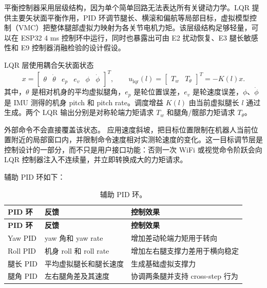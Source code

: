\documentclass[12pt, a4paper]{article}
\begin{document}
平衡控制器采用层级结构，因为单个简单回路无法表达所有关键动力学。LQR 提供主要矢状面平衡作用，PID 环调节腿长、横滚和偏航等局部目标，虚拟模型控制（VMC）把整体腿部虚拟力映射为各关节电机力矩。该层级结构足够轻量，可以在 ESP32 4 ms 控制环中运行，同时也暴露出可由 E2 扰动恢复、E3 腿长敏感性和 E9 控制器消融检验的设计假设。

LQR 层使用耦合矢状面状态
\[
x =
\begin{bmatrix}
\theta & \dot{\theta} & e_p & e_v & \phi & \dot{\phi}
\end{bmatrix}^{T},
\qquad
u_{\mathrm{lqr}}(l) =
\begin{bmatrix}
T_w & T_\theta
\end{bmatrix}^{T}
= -K(l)x .
\]
其中，\(\theta\) 是相对机身的平均虚拟腿角，\(e_p\) 是轮位置误差，\(e_v\) 是轮速度误差，\(\phi\)、\(\dot{\phi}\) 是 IMU 测得的机身 pitch 和 pitch rate。调度增益 \(K(l)\) 由当前虚拟腿长 \(l\) 通过 \texttt{} 生成。两个 LQR 输出分别是对称轮端力矩请求 \(T_w\) 和腿角/髋部力矩请求 \(T_\theta\)。

外部命令不会直接覆盖该状态。\texttt{} 应用速度斜坡，把目标位置限制在机器人当前位置附近的局部窗口内，并限制命令速度相对实测轮速度的变化。这一目标调节层是控制设计的一部分，而不只是用户接口功能：否则一次 WiFi 或视觉命令阶跃会向 LQR 控制器注入不连续量，并立即转换成大的力矩请求。

辅助 PID 环如下：

\begingroup
\singlespacing
\small
\setlength{\tabcolsep}{2pt}
\renewcommand{\arraystretch}{1.15}
\begin{longtable}{>{\RaggedRight\arraybackslash}p{}>{\RaggedRight\arraybackslash}p{}>{\RaggedRight\arraybackslash}p{}}
\caption{辅助 PID 环。}\\
\toprule
\textbf{PID 环} & \textbf{反馈} & \textbf{控制效果} \\
\midrule
\endfirsthead
\toprule
\textbf{PID 环} & \textbf{反馈} & \textbf{控制效果} \\
\midrule
\endhead
Yaw PID & yaw 角和 yaw rate & 增加差动轮端力矩用于转向 \\
Roll PID & 机身 roll 和 roll rate & 增加左右腿支撑力差用于横向稳定 \\
腿长 PID & 平均虚拟腿长和腿长速度 & 生成基础虚拟支撑力 \\
腿角 PID & 左右腿角差及其速度 & 协调两条腿并支持 cross-step 行为 \\
\bottomrule
\end{longtable}
\endgroup
\end{document}
